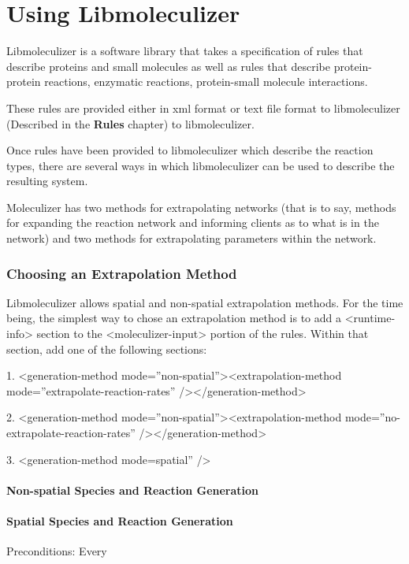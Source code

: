 \chapter{Using Libmoleculizer}
Libmoleculizer is a software library that takes a specification of
rules that describe proteins and small molecules as well as rules that
describe protein-protein reactions, enzymatic reactions, protein-small
molecule interactions.  

These rules are provided either in xml format or text file format to
libmoleculizer (Described in the {\bf Rules} chapter) to
libmoleculizer. 

Once rules have been provided to libmoleculizer which describe the
reaction types, there are several ways in which libmoleculizer can be
used to describe the resulting system.  

Moleculizer has two methods for extrapolating networks (that is to
say, methods for expanding the reaction network and informing clients
as to what is in the network) and two methods for extrapolating
parameters within the network.  

\subsection{Choosing an Extrapolation Method}

Libmoleculizer allows spatial and non-spatial extrapolation methods.
For the time being, the simplest way to chose an extrapolation method
is to add a <runtime-info> section to the <moleculizer-input> portion
of the rules.  Within that section, add one of the following sections: 

1.
<generation-method mode=''non-spatial''><extrapolation-method
mode=''extrapolate-reaction-rates'' /></generation-method>

2.
<generation-method mode=''non-spatial''><extrapolation-method
mode=''no-extrapolate-reaction-rates'' /></generation-method>

3.
<generation-method mode=spatial'' />


\subsubsection{Non-spatial Species and Reaction Generation}
\subsubsection{Spatial Species and Reaction Generation}

Preconditions:
Every 


